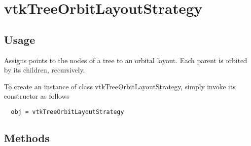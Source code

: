 \section{vtkTreeOrbitLayoutStrategy}

\subsection{Usage}

 Assigns points to the nodes of a tree to an orbital layout. Each parent
 is orbited by its children, recursively.

To create an instance of class vtkTreeOrbitLayoutStrategy, simply
invoke its constructor as follows
\begin{verbatim}
  obj = vtkTreeOrbitLayoutStrategy
\end{verbatim}
\subsection{Methods}

